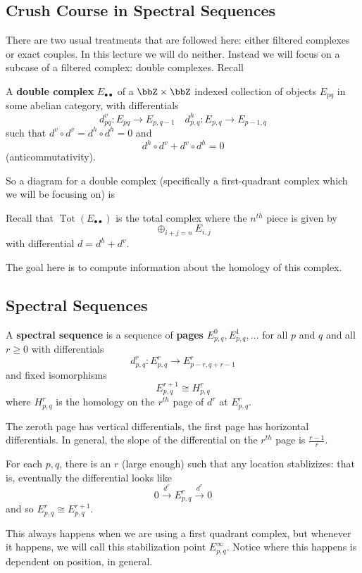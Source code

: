 \documentclass[12pt]{article}
\begin{document}
\subsection{Crush Course in Spectral Sequences}
There are two usual treatments that are followed here: either filtered complexes or exact couples. In this lecture we will do neither.
Instead we will focus on a subcase of a filtered complex: double complexes. Recall
\begin{defn}
	A \textbf{double complex} $E_{\bullet\bullet}$ of a $\bbZ\times\bbZ$ indexed collection of objects $E_{pq}$ in some 
	abelian category, with differentials 
	\[d^v_{pq}:E_{pq}\to E_{p,q-1}\quad d^h_{p,q}:E_{p,q}\to E_{p-1,q}\]
	such that $d^v\circ d^v=d^h\circ d^h=0$ and 
	\[d^h\circ d^v+d^v\circ d^h=0\]
	(anticommutativity).
\end{defn}
So a diagram for a double complex (specifically a first-quadrant complex which we will be focusing on) is 
\begin{center}
\end{center}
\begin{defn}
	Recall that $\operatorname{Tot}(E_{\bullet\bullet})$ is the total complex where the $n^{th}$ piece is given by 
	\[\oplus_{i+j=n}E_{i,j}\]
	with differential $d=d^h+d^v$.
\end{defn}
The goal here is to compute information about the homology of this complex.
\subsection{Spectral Sequences}
\begin{defn}
	A \textbf{spectral sequence} is a sequence of \textbf{pages} $E_{p,q}^0,E_{p,q}^1,\dots$ for all $p$ and $q$ and all $r\ge 0$
	with differentials
	\[d_{p,q}^r:E_{p,q}^r\to E_{p-r,q+r-1}^r\]
	and fixed isomorphisms 
	\[E_{p,q}^{r+1}\cong H_{p,q}^r\]
	where $H_{p,q}^r$ is the homology on the $r^{th}$ page of $d^r$ at $E_{p,q}^r$.
\end{defn}

The zeroth page has vertical differentials, the first page has horizontal differentials. In general, the slope of the 
differential on the $r^{th}$ page is $\frac{r-1}{r}$.

\begin{rmk}
	For each $p,q$, there is an $r$ (large enough) such that any location stablizizes:
	that is, eventually the differential looks like 
	\[0\xrightarrow{d^r}E_{p,q}^r\xrightarrow{d^r}0\]
	and so $E_{p,q}^r\cong E_{p,q}^{r+1}$.

	This always happens when we are using a first quadrant complex, but whenever it happens, we will call 
	this stabilization point $E_{p,q}^\infty$. Notice where this happens is dependent on position, in general.
\end{rmk}
\end{document}

